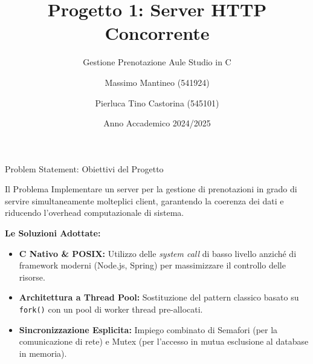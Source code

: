 \documentclass[aspectratio=169, 10pt]{beamer}
\title[Server HTTP Concorrente POSIX]{Progetto 1: Server HTTP Concorrente}
\subtitle{Gestione Prenotazione Aule Studio in C}
\author[Mantineo, Castorina]{Massimo Mantineo (541924) \and Pierluca Tino Castorina (545101)}
\institute[UniMe]{Università degli Studi di Messina \\ Dipartimento MIFT - Laurea in Informatica}
\date{Anno Accademico 2024/2025}
\begin{document}
\begin{frame}
    \titlepage
\end{frame}

\begin{frame}{Problem Statement: Obiettivi del Progetto}
    \begin{block}{Il Problema}
        Implementare un server per la gestione di prenotazioni in grado di servire simultaneamente molteplici client, garantendo la coerenza dei dati e riducendo l'overhead computazionale di sistema.
    \end{block}
    
    \vspace{0.3cm}
    
    \textbf{Le Soluzioni Adottate:}
    \begin{itemize}
        \item \textbf{C Nativo \& POSIX:} Utilizzo delle \textit{system call} di basso livello anziché di framework moderni (Node.js, Spring) per massimizzare il controllo delle risorse.
        \item \textbf{Architettura a Thread Pool:} Sostituzione del pattern classico basato su \texttt{fork()} con un pool di worker thread pre-allocati.
        \item \textbf{Sincronizzazione Esplicita:} Impiego combinato di Semafori (per la comunicazione di rete) e Mutex (per l'accesso in mutua esclusione al database in memoria).
    \end{itemize}
\end{frame}
\end{document}
